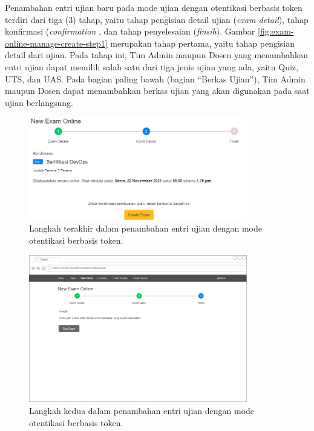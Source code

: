\documentclass[a4paper,twoside]{article}
\begin{document}
\begin{enumerate}
\begin{itemize}
\begin{itemize}
		        Penambahan entri ujian baru pada mode ujian dengan otentikasi berbasis token terdiri dari tiga (3) tahap, yaitu tahap pengisian detail ujian (\textit{exam detail}), tahap konfirmasi (\textit{confirmation} , dan tahap penyelesaian (\textit{finsih}). Gambar \ref{fig:exam-online-manage-create-step1} merupakan tahap pertama, yaitu tahap pengisian detail dari ujian. Pada tahap ini, Tim Admin maupun Dosen yang menambahkan entri ujian dapat memilih salah satu dari tiga jenis ujian yang ada, yaitu Quiz, UTS, dan UAS. Pada bagian paling bawah (bagian ``Berkas Ujian''), Tim Admin maupun Dosen dapat menambahkan berkas ujian yang akan digunakan pada saat ujian berlangsung.   
		        
		        
		        \newpage
                \begin{figure}[H]
                    \centering
                    \includegraphics[width=0.85\textwidth]{images/ui designs/exam-online/manage-step-2-2.png}
                    \caption{Langkah terakhir dalam penambahan entri ujian dengan mode otentikasi berbasis token. }
                    \label{fig:exam-online-manage-create-step2}
                \end{figure}
                
                \begin{figure}[H]
                    \centering
                    \includegraphics[width=0.85\textwidth]{images/ui designs/exam-online/manage-step-3.png}
                    \caption{Langkah kedua dalam penambahan entri ujian dengan mode otentikasi berbasis token. }
                    \label{fig:exam-online-manage-create-step3}
                \end{figure}
		        

\end{itemize}
\end{itemize}
\end{enumerate}
\end{document}
